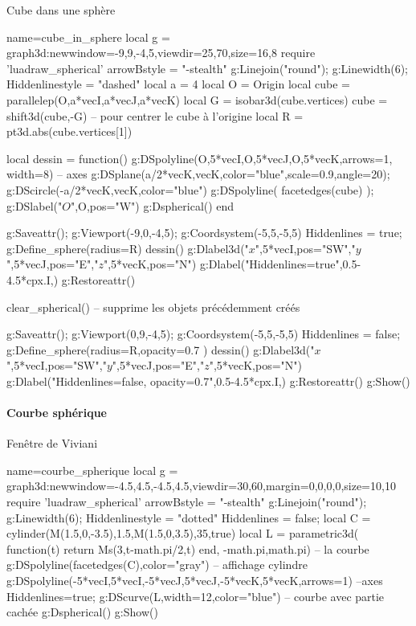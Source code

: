 \begin{demo}{Cube dans une sphère}
\begin{luadraw}{name=cube_in_sphere}
local g = graph3d:new{window={-9,9,-4,5},viewdir={25,70},size={16,8}}
require 'luadraw_spherical'
arrowBstyle = "-stealth"
g:Linejoin("round"); g:Linewidth(6); Hiddenlinestyle = "dashed"
local a = 4
local O = Origin
local cube = parallelep(O,a*vecI,a*vecJ,a*vecK)
local G = isobar3d(cube.vertices)
cube = shift3d(cube,-G) -- pour centrer le cube à l'origine
local R = pt3d.abs(cube.vertices[1])

local dessin = function()
    g:DSpolyline({{O,5*vecI},{O,5*vecJ},{O,5*vecK}},{arrows=1, width=8}) -- axes
    g:DSplane({a/2*vecK,vecK},{color="blue",scale=0.9,angle=20}); 
    g:DScircle({-a/2*vecK,vecK},{color="blue"})
    g:DSpolyline( facetedges(cube) ); g:DSlabel("$O$",O,{pos="W"})
    g:Dspherical()
end

g:Saveattr(); g:Viewport(-9,0,-4,5); g:Coordsystem(-5,5,-5,5)
Hiddenlines = true; g:Define_sphere({radius=R})
dessin()
g:Dlabel3d("$x$",5*vecI,{pos="SW"},"$y$",5*vecJ,{pos="E"},"$z$",5*vecK,{pos="N"})
g:Dlabel("Hiddenlines=true",0.5-4.5*cpx.I,{})
g:Restoreattr()

clear_spherical() -- supprime les objets précédemment créés

g:Saveattr(); g:Viewport(0,9,-4,5); g:Coordsystem(-5,5,-5,5)
Hiddenlines = false; g:Define_sphere({radius=R,opacity=0.7} )
dessin()
g:Dlabel3d("$x$",5*vecI,{pos="SW"},"$y$",5*vecJ,{pos="E"},"$z$",5*vecK,{pos="N"})
g:Dlabel("Hiddenlines=false, opacity=0.7",0.5-4.5*cpx.I,{})
g:Restoreattr()
g:Show()
\end{luadraw}
\end{demo}

\paragraph{Courbe sphérique}

\begin{demo}{Fenêtre de Viviani}
\begin{luadraw}{name=courbe_spherique}
local g = graph3d:new{window={-4.5,4.5,-4.5,4.5},viewdir={30,60},margin={0,0,0,0},size={10,10}}
require 'luadraw_spherical'
arrowBstyle = "-stealth"
g:Linejoin("round"); g:Linewidth(6); Hiddenlinestyle = "dotted"
Hiddenlines = false; 
local C = cylinder(M(1.5,0,-3.5),1.5,M(1.5,0,3.5),35,true)
local L = parametric3d( function(t) return Ms(3,t-math.pi/2,t) end, -math.pi,math.pi) -- la courbe
g:DSpolyline(facetedges(C),{color="gray"}) -- affichage cylindre
g:DSpolyline({{-5*vecI,5*vecI},{-5*vecJ,5*vecJ},{-5*vecK,5*vecK}},{arrows=1}) --axes
Hiddenlines=true; g:DScurve(L,{width=12,color="blue"}) -- courbe avec partie cachée
g:Dspherical()
g:Show()
\end{luadraw}
\end{demo}

